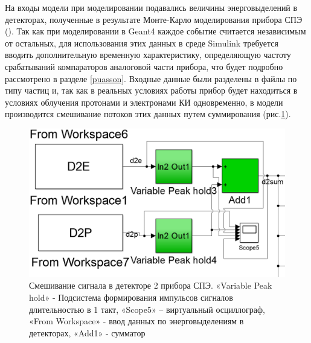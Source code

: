 На входы модели при моделировании подавались величины энерговыделений в детекторах, полученные в результате Монте-Карло моделирования прибора СПЭ (). Так как при моделировании в Geant4 каждое событие считается независимым от остальных, для использования этих данных в среде Simulink требуется вводить дополнительную временную характеристику, определяющую частоту срабатываний компараторов аналоговой части прибора, что будет подробно рассмотрено в разделе \ref{puasson}. 
Входные данные были разделены в файлы по типу частиц и, так как в реальных условиях работы прибор будет находиться в условиях облучения протонами и электронами КИ одновременно, в модели производится смешивание потоков этих данных путем суммирования (рис.\ref{fig:simulink_summ}).
\begin{figure}
\centering
\includegraphics[width=0.7\linewidth]{images/simulink_summ}
\caption[Смешивание сигнала в детекторе 2 прибора СПЭ.]{Смешивание сигнала в детекторе 2 прибора СПЭ. «Variable Peak hold» - Подсистема формирования импульсов сигналов длительностью в 1 такт, «Scope5» – виртуальный осциллограф, «From Workspace» - ввод данных по энерговыделениям в детекторах, «Add1» - сумматор}
\label{fig:simulink_summ}
\end{figure}






